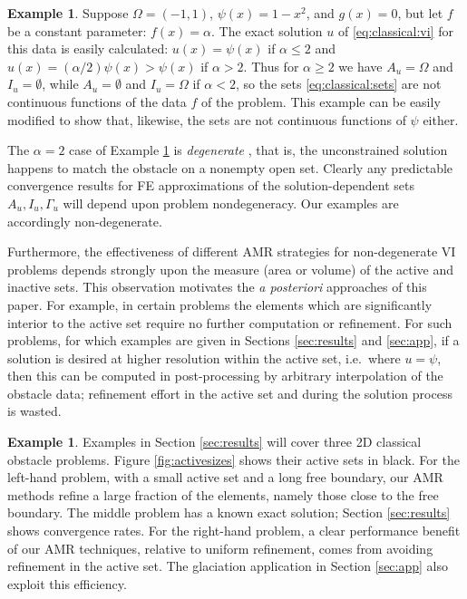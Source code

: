 \documentclass[]{interact}
\theoremstyle{plain}%
\theoremstyle{definition}
\newtheorem{example}[theorem]{Example}
\theoremstyle{remark}
\begin{document}
\begin{example} \label{example:notcontinuous}  Suppose $\Omega = (-1,1)$, $\psi(x)=1 - x^2$, and $g(x)=0$, but let $f$ be a constant parameter: $f(x)=\alpha$.  The exact solution $u$ of \eqref{eq:classical:vi} for this data is easily calculated: $u(x)=\psi(x)$ if $\alpha\le 2$ and $u(x)=(\alpha/2)\psi(x)>\psi(x)$ if $\alpha>2$.  Thus for $\alpha \ge 2$ we have $A_u=\Omega$ and $I_u=\emptyset$, while $A_u=\emptyset$ and $I_u=\Omega$ if $\alpha<2$, so the sets \eqref{eq:classical:sets} are not continuous functions of the data $f$ of the problem.  This example can be easily modified to show that, likewise, the sets are not continuous functions of $\psi$ either.
\end{example}

The $\alpha=2$ case of Example \ref{example:notcontinuous} is \emph{degenerate} \cite{KinderlehrerStampacchia1980}, that is, the unconstrained solution happens to match the obstacle on a nonempty open set.  Clearly any predictable convergence results for FE approximations of the solution-dependent sets $A_u,I_u,\Gamma_u$ will depend upon problem nondegeneracy.  Our examples are accordingly non-degenerate.

Furthermore, the effectiveness of different AMR strategies for non-degenerate VI problems depends strongly upon the measure (area or volume) of the active and inactive sets.  This observation motivates the \emph{a posteriori} approaches of this paper.  For example, in certain problems the elements which are significantly interior to the active set require no further computation or refinement.  For such problems, for which examples are given in Sections \ref{sec:results} and \ref{sec:app}, if a solution is desired at higher resolution within the active set, i.e.~where $u=\psi$, then this can be computed in post-processing by arbitrary interpolation of the obstacle data; refinement effort in the active set and during the solution process is wasted.

\begin{example} \label{example:activesets} Examples in Section \ref{sec:results} will cover three 2D classical obstacle problems.  Figure \ref{fig:activesizes} shows their active sets in black.  For the left-hand problem, with a small active set and a long free boundary, our AMR methods refine a large fraction of the elements, namely those close to the free boundary.  The middle problem has a known exact solution; Section \ref{sec:results} shows convergence rates.  For the right-hand problem, a clear performance benefit of our AMR techniques, relative to uniform refinement, comes from avoiding refinement in the active set.  The glaciation application in Section \ref{sec:app} also exploit this efficiency. \end{example}
\end{document}
